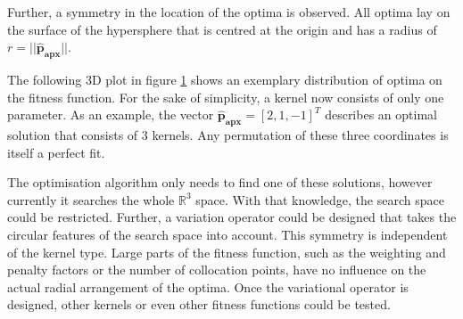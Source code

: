 \documentclass[./\jobname.tex]{subfiles}
\begin{document}
Further, a symmetry in the location of the optima is observed. All optima lay on the surface of the hypersphere that is centred at the origin and has a radius of $r = || \mathbf{\hat{p}_{apx}} ||$. 

The following 3D plot in figure \ref{fig:optima_distribution} shows an exemplary distribution of optima on the fitness function. For the sake of simplicity, a kernel now consists of only one parameter. As an example, the vector $\mathbf{\hat{p}_{apx}} = \left[ 2, 1, -1 \right]^T$ describes an optimal solution that consists of 3 kernels. Any permutation of these three coordinates is itself a perfect fit. 

\begin{figure}[H]
	\centering
	\noindent{}
	\label{fig:optima_distribution}
\end{figure}

The optimisation algorithm only needs to find one of these solutions, however currently it searches the whole $\mathbb{R}^3$ space. With that knowledge, the search space could be restricted. Further, a variation operator could be designed that takes the circular features of the search space into account. This symmetry is independent of the kernel type. Large parts of the fitness function, such as the weighting and penalty factors or the number of collocation points, have no influence on the actual radial arrangement of the optima. Once the variational operator is designed, other kernels or even other fitness functions could be tested. 
\end{document}
